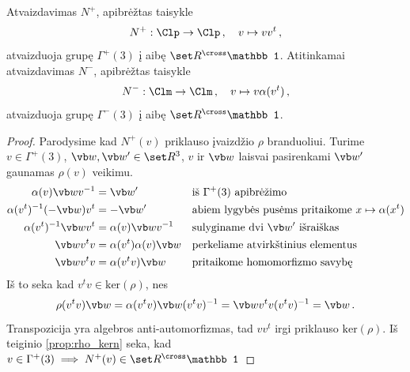 \begin{proposition}
	Atvaizdavimas $N^+$, apibrėžtas taisykle 
	\begin{equation}
		N^+: \Clp \to \Clp
		\,,\quad
		v \mapsto vv^t
		\,,
	\end{equation}
	atvaizduoja grupę $\Gamma^+(3)$ į aibę $\set R^{\cross}\mathbb1$. 
	Atitinkamai atvaizdavimas $N^-$, apibrėžtas taisykle 
	\begin{equation}
		N^-: \Clm \to \Clm
		\,,\quad
		v \mapsto v\alpha(v^t)
		\,,
	\end{equation}
	atvaizduoja grupę $\Gamma^-(3)$ į aibę $\set R^{\cross}\mathbb1$. 
\end{proposition}
\begin{proof}
	Parodysime kad $N^+(v)$ priklauso įvaizdžio $\rho$ branduoliui.
	Turime $v \in \Gamma^+(3)$, $\vb w, \vb w' \in \set R^3$,
	$v$ ir $\vb w$ laisvai pasirenkami $\vb w'$ gaunamas $\rho(v)$ veikimu.
	\begin{equation}
		\begin{aligned}
			\alpha(v)\vb w v^{-1} &= \vb w'
			&&\text{iš $\Gamma^+(3)$ apibrėžimo}
			\\
			\alpha(v^t)^{-1}  (-\vb w)  v^t &= -\vb w'
			&&\text{abiem lygybės pusėms pritaikome $x \mapsto \alpha(x^t)$}
			\\
			\alpha(v^t)^{-1}  \vb w  v^t &= \alpha(v)\vb w v^{-1}
			&&\text{sulyginame dvi $\vb w'$ išraiškas}
			\\
			\vb w  v^t v&= \alpha(v^t)\alpha(v)\vb w 
			&&\text{perkeliame atvirkštinius elementus}
			\\
			\vb w  v^t v&= \alpha(v^t v)\vb w 
			&&\text{pritaikome homomorfizmo savybę}
		\end{aligned}
	\end{equation}
	Iš to seka kad $v^t v \in \mathup{ker}(\rho)$, nes
	\begin{equation}
		\rho(v^t v)\vb w 
		= \alpha(v^t v)\vb w (v^t v)^{-1}
		= \vb w  v^t v (v^t v)^{-1}
		= \vb w 
		\,.
	\end{equation}
	Transpozicija yra algebros anti-automorfizmas,
	tad $v v^t$ irgi priklauso $\mathup{ker}(\rho)$.
	Iš teiginio \ref{prop:rho_kern} seka,
	kad $v \in \Gamma^+(3) \implies N^+(v) \in \set R^{\cross} \mathbb1 $ 


\end{proof}
